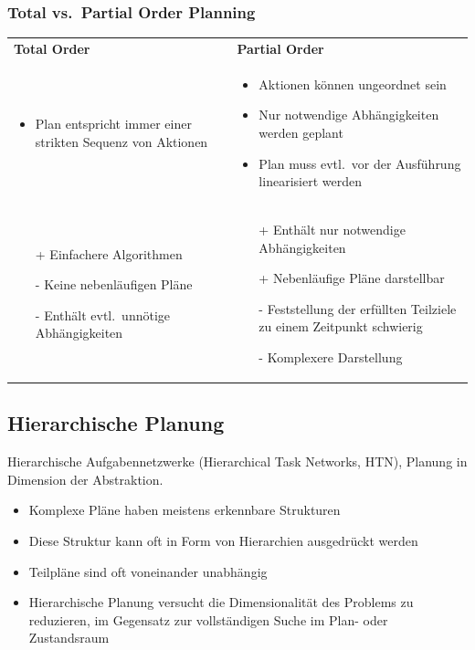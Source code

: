 \subsubsection{Total vs.\ Partial Order Planning}
\begin{tabular}{p{} p{}}
\textbf{Total Order} & \textbf{Partial Order}\\
\begin{itemize}
	\item Plan entspricht immer einer strikten Sequenz von Aktionen
\end{itemize}
&
\begin{itemize}
	\item Aktionen können ungeordnet sein
	\item Nur notwendige Abhängigkeiten werden geplant
	\item Plan muss evtl.\ vor der Ausführung linearisiert werden
\end{itemize}
\\
\begin{itemize}
	\item[+] Einfachere Algorithmen
	\item[-] Keine nebenläufigen Pläne
	\item[-] Enthält evtl.\ unnötige Abhängigkeiten
\end{itemize}
&
\begin{itemize}
	\item[+] Enthält nur notwendige Abhängigkeiten
	\item[+] Nebenläufige Pläne darstellbar
	\item[-] Feststellung der erfüllten Teilziele zu einem Zeitpunkt schwierig
	\item[-] Komplexere Darstellung
\end{itemize}
\end{tabular}


\subsection{Hierarchische Planung}
\label{ch06_hierarchischePlanung}
Hierarchische Aufgabennetzwerke (Hierarchical Task Networks, HTN), Planung in Dimension der Abstraktion.
\begin{itemize}
	\item Komplexe Pläne haben meistens erkennbare Strukturen
	\item Diese Struktur kann oft in Form von Hierarchien ausgedrückt werden
	\item Teilpläne sind oft voneinander unabhängig
	\item Hierarchische Planung versucht die Dimensionalität des Problems zu reduzieren, im Gegensatz zur vollständigen Suche im Plan- oder Zustandsraum
\end{itemize}

